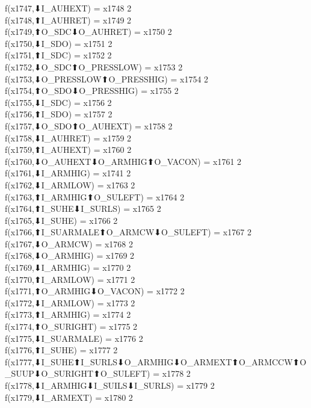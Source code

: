 f(x1747,⬇I_AUHEXT) = x1748 {2} \\
f(x1748,⬆I_AUHRET) = x1749 {2} \\
f(x1749,⬆O_SDC⬇O_AUHRET) = x1750 {2} \\
f(x1750,⬇I_SDO) = x1751 {2} \\
f(x1751,⬆I_SDC) = x1752 {2} \\
f(x1752,⬇O_SDC⬆O_PRESSLOW) = x1753 {2} \\
f(x1753,⬇O_PRESSLOW⬆O_PRESSHIG) = x1754 {2} \\
f(x1754,⬆O_SDO⬇O_PRESSHIG) = x1755 {2} \\
f(x1755,⬇I_SDC) = x1756 {2} \\
f(x1756,⬆I_SDO) = x1757 {2} \\
f(x1757,⬇O_SDO⬆O_AUHEXT) = x1758 {2} \\
f(x1758,⬇I_AUHRET) = x1759 {2} \\
f(x1759,⬆I_AUHEXT) = x1760 {2} \\
f(x1760,⬇O_AUHEXT⬇O_ARMHIG⬆O_VACON) = x1761 {2} \\
f(x1761,⬇I_ARMHIG) = x1741 {2} \\
f(x1762,⬇I_ARMLOW) = x1763 {2} \\
f(x1763,⬆I_ARMHIG⬆O_SULEFT) = x1764 {2} \\
f(x1764,⬆I_SUHE⬇I_SURLS) = x1765 {2} \\
f(x1765,⬇I_SUHE) = x1766 {2} \\
f(x1766,⬆I_SUARMALE⬆O_ARMCW⬇O_SULEFT) = x1767 {2} \\
f(x1767,⬇O_ARMCW) = x1768 {2} \\
f(x1768,⬇O_ARMHIG) = x1769 {2} \\
f(x1769,⬇I_ARMHIG) = x1770 {2} \\
f(x1770,⬆I_ARMLOW) = x1771 {2} \\
f(x1771,⬆O_ARMHIG⬇O_VACON) = x1772 {2} \\
f(x1772,⬇I_ARMLOW) = x1773 {2} \\
f(x1773,⬆I_ARMHIG) = x1774 {2} \\
f(x1774,⬆O_SURIGHT) = x1775 {2} \\
f(x1775,⬇I_SUARMALE) = x1776 {2} \\
f(x1776,⬆I_SUHE) = x1777 {2} \\
f(x1777,⬇I_SUHE⬆I_SURLS⬇O_ARMHIG⬇O_ARMEXT⬆O_ARMCCW⬆O_SUUP⬇O_SURIGHT⬆O_SULEFT) = x1778 {2} \\
f(x1778,⬇I_ARMHIG⬇I_SUILS⬇I_SURLS) = x1779 {2} \\
f(x1779,⬇I_ARMEXT) = x1780 {2} \\
